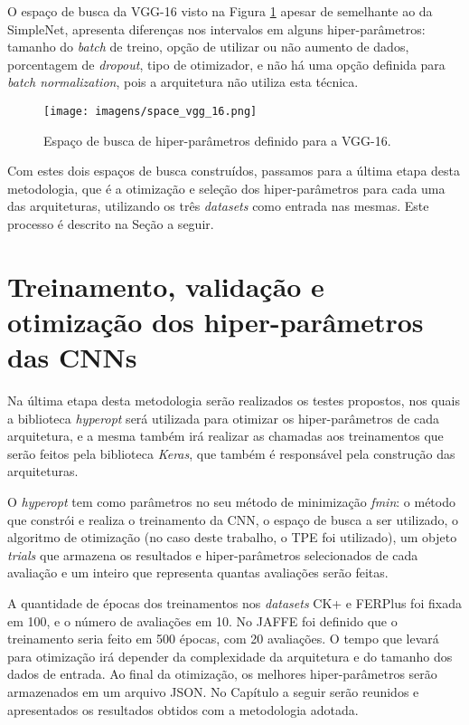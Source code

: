 \documentclass[
12pt,       %
openright,      %
oneside,      %
a4paper,      %
english,      %
french,       %
spanish,      %
brazil        %
]{abntex2}
\begin{document}
O espaço de busca da VGG-16 visto na Figura \ref{fig:space_vgg_16} apesar de semelhante ao da SimpleNet, apresenta diferenças nos intervalos em alguns hiper-parâmetros: tamanho do \textit{batch} de treino, opção de utilizar ou não aumento de dados, porcentagem de \textit{dropout}, tipo de otimizador, e não há uma opção definida para \textit{batch normalization}, pois a arquitetura não utiliza esta técnica.

\begin{figure}[H]
\centering
\caption{Espaço de busca de hiper-parâmetros definido para a VGG-16.}
\texttt{[image: imagens/space\_vgg\_16.png]}
\label{fig:space_vgg_16}
\end{figure}

Com estes dois espaços de busca construídos, passamos para a última etapa desta metodologia, que é a otimização e seleção dos hiper-parâmetros para cada uma das arquiteturas, utilizando os três \textit{datasets} como entrada nas mesmas. Este processo é descrito na Seção a seguir.

\section{Treinamento, validação e otimização dos hiper-parâmetros das CNNs} \label{trein-valid-otimizacao}

Na última etapa desta metodologia serão realizados os testes propostos, nos quais a biblioteca \textit{hyperopt} será utilizada para otimizar os hiper-parâmetros de cada arquitetura, e a mesma também irá realizar as chamadas aos treinamentos que serão feitos pela biblioteca \textit{Keras}, que também é responsável pela construção das arquiteturas. 

O \textit{hyperopt} tem como parâmetros no seu método de minimização \textit{fmin}: o método que constrói e realiza o treinamento da CNN, o espaço de busca a ser utilizado, o algoritmo de otimização (no caso deste trabalho, o TPE foi utilizado), um objeto \textit{trials} que armazena os resultados e hiper-parâmetros selecionados de cada avaliação e um inteiro que representa quantas avaliações serão feitas.

A quantidade de épocas dos treinamentos nos \textit{datasets} CK+ e FERPlus foi fixada em 100, e o número de avaliações em 10. No JAFFE foi definido que o treinamento seria feito em 500 épocas, com 20 avaliações. O tempo que levará para otimização irá depender da complexidade da arquitetura e do tamanho dos dados de entrada. Ao final da otimização, os melhores hiper-parâmetros serão armazenados em um arquivo JSON. No Capítulo a seguir serão reunidos e apresentados os resultados obtidos com a metodologia adotada.
\end{document}
